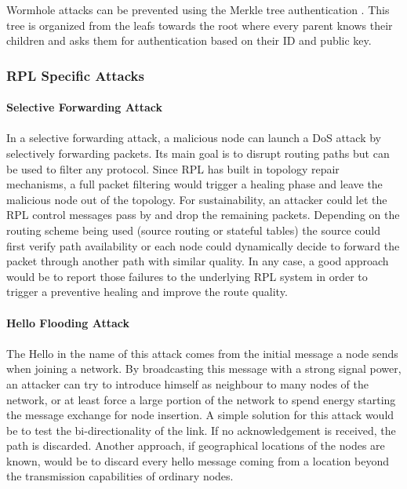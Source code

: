 Wormhole attacks can be prevented using the Merkle tree authentication \cite{Khan2013}. This tree is organized from the leafs towards the root where every parent knows their children and asks them for authentication based on their ID and public key.
\pagebreak

\subsubsection{RPL Specific Attacks}
\paragraph{} 


\paragraph{\textbf{Selective Forwarding Attack}}
\paragraph{}
In a selective forwarding attack, a malicious node can launch a \ac{DoS} attack by selectively forwarding packets. Its main goal is to disrupt routing paths but can be used to filter any protocol. Since \ac{RPL} has built in topology repair mechanisms, a full packet filtering would trigger a healing phase and leave the malicious node out of the topology. For sustainability, an attacker could let the RPL control messages pass by and drop the remaining packets. Depending on the routing scheme being used (source routing or stateful tables) the source could first verify path availability or each node could dynamically decide to forward the packet through another path with similar quality. In any case, a good approach would be to report those failures to the underlying RPL system in order to trigger a preventive healing and improve the route quality.

\paragraph{\textbf{Hello Flooding Attack}}
\paragraph{}
The Hello in the name of this attack comes from the initial message a node sends when joining a network. By broadcasting this message with a strong signal power, an attacker can try to introduce himself as neighbour to many nodes of the network, or at least force a large portion of the network to spend energy starting the message exchange for node insertion. A simple solution for this attack would be to test the bi-directionality of the link. If no acknowledgement is received, the path is discarded. Another approach, if geographical locations of the nodes are known, would be to discard every hello message coming from a location beyond the transmission capabilities of ordinary nodes.

